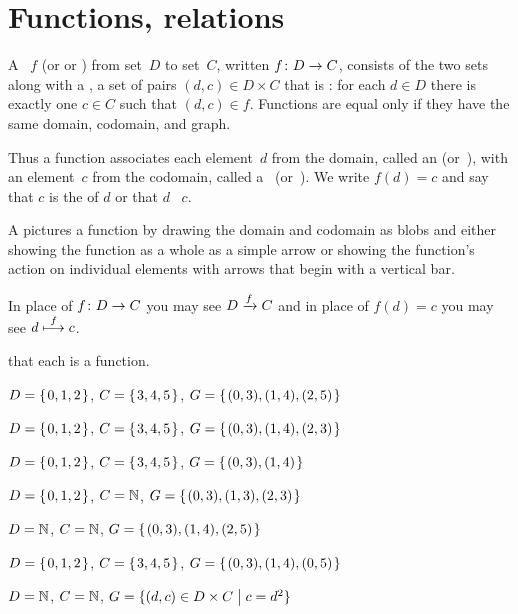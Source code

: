 \documentclass{ibl}
\begin{document}
\chapter{Functions, relations}
\begin{df}
A ~$f$ (or  or ) 
from  set~$D$
to  set~$C$, written $\mbox{$f\colon D\to C$}$,
consists of the two sets along with a , 
a set of pairs $(d,c)\in D\times C$ that is 
: for each $d\in D$ there is
exactly one $c\in C$ such that $(d,c)\in f$. 
Functions are equal only if they have the same domain, codomain,
and graph.

Thus a function associates each element~$d$ from the domain,
called an  (or~),
with an element~$c$ from the codomain, 
called a~ (or~). 
We write $f(d)=c$ and say that $c$ is the  of $d$ 
or that $d$ ~$c$.
\end{df}

A  pictures a function by drawing the domain and 
codomain as blobs and 
either showing the function as a whole as a simple arrow   
or showing the function's action on individual elements 
with arrows that begin with a vertical bar.
\begin{center}
  \hspace{8em}
\end{center}
In place of $\mbox{$f\colon D\to C$}$ you may see $D\xrightarrow{f} C$ and
in place of $f(d)=c$ you may see $d\stackrel{f}{\longmapsto}c$.

\begin{ex} \pord{} that each is a function.\label{FindFunctions}
\begin{exes}
\item $D=\mbox{$\{\hspace{0.1em}0,1,2\hspace{0.1em}\}$}$, $C=\mbox{$\{\hspace{0.1em}3,4,5\hspace{0.1em}\}$}$,
  $G=\mbox{$\{\hspace{0.1em}(0,3), (1,4), (2,5)\hspace{0.1em}\}$}$    
\item $D=\mbox{$\{\hspace{0.1em}0,1,2\hspace{0.1em}\}$}$, $C=\mbox{$\{\hspace{0.1em}3,4,5\hspace{0.1em}\}$}$,
  $G=\mbox{$\{\hspace{0.1em}(0,3), (1,4), (2,3)\hspace{0.1em}\}$}$    
\item $D=\mbox{$\{\hspace{0.1em}0,1,2\hspace{0.1em}\}$}$, $C=\mbox{$\{\hspace{0.1em}3,4,5\hspace{0.1em}\}$}$,
  $G=\mbox{$\{\hspace{0.1em}(0,3), (1,4)\hspace{0.1em}\}$}$    
\item $D=\mbox{$\{\hspace{0.1em}0,1,2\hspace{0.1em}\}$}$, $C=\mathbb{N}$,
  $G=\mbox{$\{\hspace{0.1em}(0,3), (1,3), (2,3)\hspace{0.1em}\}$}$    
\item $D=\mathbb{N}$, $C=\mathbb{N}$,
  $G=\mbox{$\{\hspace{0.1em}(0,3), (1,4), (2,5)\hspace{0.1em}\}$}$    
\item $D=\mbox{$\{\hspace{0.1em}0,1,2\hspace{0.1em}\}$}$, $C=\mbox{$\{\hspace{0.1em}3,4,5\hspace{0.1em}\}$}$,
  $G=\mbox{$\{\hspace{0.1em}(0,3), (1,4), (0,5)\hspace{0.1em}\}$}$    
\item $D=\mathbb{N}$, $C=\mathbb{N}$,
  $G=\{(d,c)\in D\times C \bigm| c=d^2\}$    
\end{exes}
\end{ex}
\end{document}

